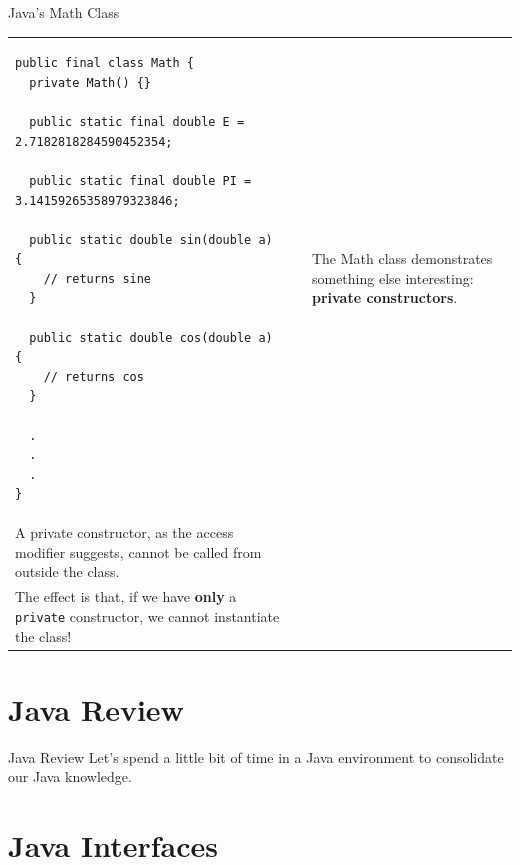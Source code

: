 \documentclass[aspectratio=169]{beamer}
\makeatletter
\newenvironment{splitslide}
{
\centering
\begin{tabular}{@{}p{0.50\textwidth} | p{0.025\textwidth}@{} p{0.4\textwidth}@{}}
}
{
\end{tabular}
}
\makeatother
\begin{document}
\begin{frame}[fragile]{Java's Math Class}
\begin{splitslide}

\begin{Verbatim}[fontsize=\tiny]
public final class Math {
  private Math() {}
  
  public static final double E = 2.7182818284590452354;
  
  public static final double PI = 3.14159265358979323846;
  
  public static double sin(double a) {
    // returns sine  
  }
  
  public static double cos(double a) {
    // returns cos  
  }
  
  .
  .
  .
}
\end{Verbatim}

&&

\raggedright
\vspace{1em}
The Math class demonstrates something else interesting: \textbf{private constructors}. \\
\vspace{0.5em}
A private constructor, as the access modifier suggests, cannot be called from outside the class. \\
\vspace{0.5em}
The effect is that, if we have \textbf{only} a \texttt{private} constructor, we cannot instantiate the class! \\

\end{splitslide}
\end{frame}



\section*{Java Review}



\begin{frame}{Java Review}
Let's spend a little bit of time in a Java environment to consolidate our Java knowledge.
\end{frame}

\section*{Java Interfaces}
\end{document}
